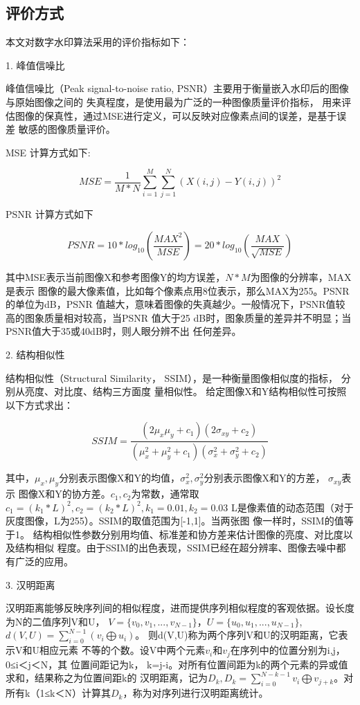 \documentclass[a4paper,zihao=5,UTF8]{ctexart}
\begin{document}
\subsection{评价方式}

本文对数字水印算法采用的评价指标如下：

1. 峰值信噪比

峰值信噪比（Peak signal-to-noise ratio, PSNR）主要用于衡量嵌入水印后的图像与原始图像之间的
失真程度，是使用最为广泛的一种图像质量评价指标，
用来评估图像的保真性，通过MSE进行定义，可以反映对应像素点间的误差，是基于误差
敏感的图像质量评价。

MSE 计算方式如下:

$$
MSE = \frac{1}{M * N} \sum_{i=1}^M \sum_{j=1}^N (X(i, j) - Y(i, j))^2
$$

PSNR 计算方式如下

$$
PSNR = 10 * log_{10} (\frac{MAX^2}{MSE}) = 20 * log_{10} (\frac{MAX}{\sqrt{MSE}})
$$

其中MSE表示当前图像X和参考图像Y的均方误差，$N * M$为图像的分辨率，MAX是表示
图像的最大像素值，比如每个像素点用8位表示，那么MAX为255。PSNR的单位为dB，PSNR
值越大，意味着图像的失真越少。一般情况下，PSNR值较高的图象质量相对较高，当PSNR
值大于25 dB时，图象质量的差异并不明显；当PSNR值大于35或40dB时，则人眼分辨不出
任何差异。

2. 结构相似性

结构相似性（Structural Similarity， SSIM），是一种衡量图像相似度的指标，
分别从亮度、对比度、结构三方面度
量相似性。
给定图像X和Y结构相似性可按照以下方式求出：

$$
SSIM = \frac{(2\mu_x\mu_y + c_1)(2\sigma_{xy} + c_2)}{(\mu_x^2 + \mu_y^2 + c_1)(\sigma_x^2 + \sigma_y^2 + c_2)}
$$

其中，$\mu_x, \mu_y$分别表示图像X和Y的均值，$\sigma_x^2, \sigma_y^2$分别表示图像X和Y的方差，
$\sigma_{xy}$表示
图像X和Y的协方差。$c_1, c_2$为常数，通常取$c_1 = (k_1 * L)^2, c_2 = (k_2 * L)^2, k_1=0.01, k_2=0.03$
L是像素值的动态范围（对于灰度图像，L为255）。SSIM的取值范围为[-1,1]。当两张图
像一样时，SSIM的值等于1。
结构相似性参数分别用均值、标准差和协方差来估计图像的亮度、对比度以及结构相似
程度。由于SSIM的出色表现，SSIM已经在超分辨率、图像去噪中都有广泛的应用。

3. 汉明距离

    汉明距离能够反映序列间的相似程度，进而提供序列相似程度的客观依据。设长度为N的二值序列V和U，
$V=\{v_0, v_1, ..., v_{N-1}\}$，$U=\{u_0, u_1, ..., u_{N-1}\}$, $d(V, U) = \sum_{i=0}^{N-1}(v_i \bigoplus u_i)$。
则d(V,U)称为两个序列V和U的汉明距离，它表示V和U相应元素
不等的个数。设V中两个元素$v_i$和$v_j$在序列中的位置分别为i,j，0≤i＜j＜N，其
位置间距记为k，
k=j-i。对所有位置间距为k的两个元素的异或值求和，结果称之为位置间距k的
汉明距离，记为$D_k, D_k=\sum_{i=0}^{N-k-1}v_i \bigoplus v_{j+k}$。对
所有k（1≤k＜N）计算其$D_k$，称为对序列进行汉明距离统计。
\end{document}
